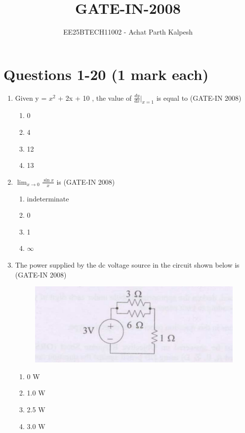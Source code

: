 \documentclass[journal,12pt,onecolumn]{IEEEtran}
\title{GATE-IN-2008}
\author{EE25BTECH11002 - Achat Parth Kalpesh }
\date{}
\theoremstyle{remark}
\begin{document}
\maketitle

\section*{Questions 1-20 (1 mark each)}
\begin{enumerate}
    \item Given y = $x^2$ + 2x + 10 , the value of $\frac{dy}{dx}\Big|_{x=1}$ is equal to \hfill{(GATE-IN 2008)}
    \begin{multicols}{4}
    \begin{enumerate} 
        \item 0
        \item 4 
        \item 12 
        \item 13
    \end{enumerate}
    \end{multicols}
    
    \item $\lim_{x \to 0} \frac{\sin x}{x}$ is \hfill{(GATE-IN 2008)}
    \begin{multicols}{4}
    \begin{enumerate} 
        \item indeterminate
        \item  0
        \item  1
        \item $\infty$
    \end{enumerate}
    \end{multicols}
    
    \item  The power supplied by the dc voltage source in the circuit shown below is  \hfill{(GATE-IN 2008)}
    
    \begin{figure}[H]
    \centering
    \includegraphics[width=0.5\columnwidth]{figs/i1.jpg}
    \caption{}
    \label{fig:placeholder1}
\end{figure}
\begin{multicols}{4}
        \begin{enumerate} 
        \item 0 W
        \item 1.0 W
        \item 2.5 W 
        \item 3.0 W
    \end{enumerate}
    \end{multicols}
    

\end{enumerate}
\end{document}
